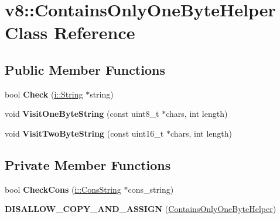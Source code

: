 \hypertarget{classv8_1_1_contains_only_one_byte_helper}{}\section{v8\+:\+:Contains\+Only\+One\+Byte\+Helper Class Reference}
\label{classv8_1_1_contains_only_one_byte_helper}
\subsection*{Public Member Functions}
\begin{DoxyCompactItemize}
\item 
bool {\bfseries Check} (\hyperlink{classv8_1_1internal_1_1_string}{i\+::\+String} $\ast$string)\hypertarget{classv8_1_1_contains_only_one_byte_helper_a9b25131dc12e92aa8299bf0ca8bfc805}{}\label{classv8_1_1_contains_only_one_byte_helper_a9b25131dc12e92aa8299bf0ca8bfc805}

\item 
void {\bfseries Visit\+One\+Byte\+String} (const uint8\+\_\+t $\ast$chars, int length)\hypertarget{classv8_1_1_contains_only_one_byte_helper_a0dce1e691846cc44ad0e03c69297cd65}{}\label{classv8_1_1_contains_only_one_byte_helper_a0dce1e691846cc44ad0e03c69297cd65}

\item 
void {\bfseries Visit\+Two\+Byte\+String} (const uint16\+\_\+t $\ast$chars, int length)\hypertarget{classv8_1_1_contains_only_one_byte_helper_a2ce6fa752fda1b8cb58c00e32a5bae70}{}\label{classv8_1_1_contains_only_one_byte_helper_a2ce6fa752fda1b8cb58c00e32a5bae70}

\end{DoxyCompactItemize}
\subsection*{Private Member Functions}
\begin{DoxyCompactItemize}
\item 
bool {\bfseries Check\+Cons} (\hyperlink{classv8_1_1internal_1_1_cons_string}{i\+::\+Cons\+String} $\ast$cons\+\_\+string)\hypertarget{classv8_1_1_contains_only_one_byte_helper_a641c35def4eb46384c600957d521d319}{}\label{classv8_1_1_contains_only_one_byte_helper_a641c35def4eb46384c600957d521d319}

\item 
{\bfseries D\+I\+S\+A\+L\+L\+O\+W\+\_\+\+C\+O\+P\+Y\+\_\+\+A\+N\+D\+\_\+\+A\+S\+S\+I\+GN} (\hyperlink{classv8_1_1_contains_only_one_byte_helper}{Contains\+Only\+One\+Byte\+Helper})\hypertarget{classv8_1_1_contains_only_one_byte_helper_a03a86f7e8956164fad28f01316bc822d}{}\label{classv8_1_1_contains_only_one_byte_helper_a03a86f7e8956164fad28f01316bc822d}

\end{DoxyCompactItemize}
